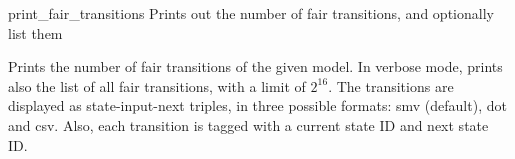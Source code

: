 \begin{nusmvCommand}{print\_fair\_transitions} {Prints out the number of fair transitions, and optionally list them}


Prints the number of fair transitions of the given model. In verbose
mode, prints also the list of all fair transitions, with a limit of
$2^{16}$. The transitions are displayed as state-input-next triples,
in three possible formats: smv (default), dot and csv. Also, each
transition is tagged with a current state ID and next state ID.

\end{nusmvCommand}
